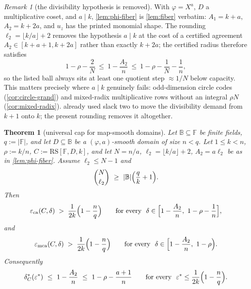 \documentclass[11pt]{article}
\newtheorem{theorem}{Theorem}[section]
\theoremstyle{definition}
\theoremstyle{remark}
\newtheorem{remark}[remark]{Remark}
\newcommand{\F}{\mathbb{F}}
\newcommand{\B}{\mathbb{B}}
\newcommand{\RS}{\mathrm{RS}}
\newcommand{\eca}{\varepsilon_{\mathrm{ca}}}
\newcommand{\emca}{\varepsilon_{\mathrm{mca}}}
\begin{document}
\begin{remark}[the divisibility hypothesis is removed]\label{rem:no-divisibility}
With $\varphi=X^a$, $D$ a multiplicative coset, and $a\mid k$, \cref{lem:phi-fiber} is \cref{lem:fiber} verbatim: $A_1=k+a$, $A_2=k+2a$, and $u_z$ has the printed monomial shape. The rounding $\ell_2=\lfloor k/a\rfloor+2$ removes the hypothesis $a\mid k$ at the cost of a certified agreement $A_2\in[k+a+1,k+2a]$ rather than exactly $k+2a$; the certified radius therefore satisfies
\[
1-\rho-\frac2N\ \le\ 1-\frac{A_2}n\ \le\ 1-\rho-\frac1N-\frac1n,
\]
so the listed ball always sits at least one quotient step $\approx1/N$ below capacity. This matters precisely where $a\mid k$ genuinely fails: odd-dimension circle codes (\cref{cor:circle-grand}) and mixed-radix multiplicative rows without an integral $\rho N$ (\cref{cor:mixed-radix}).  already used slack two to move the divisibility demand from $k+1$ onto $k$; the present rounding removes it altogether.
\end{remark}

\begin{theorem}[universal cap for map-smooth domains]\label{thm:phi-cap}
Let $\B\subseteq\F$ be finite fields, $q:=|\F|$, and let $D\subseteq\B$ be a $(\varphi,a)$-smooth domain of size $n<q$. Let $1\le k<n$, $\rho:=k/n$, $C:=\RS[\F,D,k]$, and let $N=n/a$, $\ell_2=\lfloor k/a\rfloor+2$, $A_2=a\ell_2$ be as in \cref{lem:phi-fiber}. Assume $\ell_2\le N-1$ and
\begin{equation}\label{eq:hyp-phi}
\binom N{\ell_2}\ \ge\ |\B|\Bigl(\frac qk+1\Bigr).
\end{equation}
Then
\[
\eca(C,\delta)\;>\;\frac1{2k}\Bigl(1-\frac nq\Bigr)
\qquad\text{for every }\ \delta\in\Bigl[1-\frac{A_2}n,\ 1-\rho-\frac1n\Bigr],
\]
and
\[
\emca(C,\delta)\;>\;\frac1{2k}\Bigl(1-\frac nq\Bigr)
\qquad\text{for every }\ \delta\in\Bigl[1-\frac{A_2}n,\ 1-\rho\Bigr).
\]
Consequently
\[
\delta^*_C(\varepsilon^*)\ \le\ 1-\frac{A_2}n\ \le\ 1-\rho-\frac{a+1}n
\qquad\text{for every }\ \varepsilon^*\le\frac1{2k}\Bigl(1-\frac nq\Bigr).
\]
\end{theorem}
\end{document}
